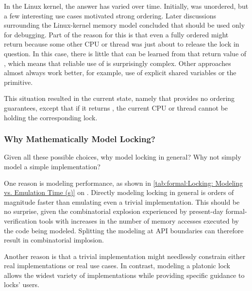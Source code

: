 In the Linux kernel, the answer has varied over time.
Initially,  was unordered, but a few interesting
use cases motivated strong ordering.
Later discussions surrounding the Linux-kernel memory model concluded
that  should be used only for debugging.
Part of the reason for this is that even a fully ordered
 might return  because some other CPU or
thread was just about to release the lock in question.
In this case, there is little that can be learned from that return value
of , which means that reliable use of 
is surprisingly complex.
Other approaches almost always work better, for example, use of explicit
shared variables or the  primitive.

This situation resulted in the current state, namely that
 provides no ordering guarantees, except that if
it returns , the current CPU or thread cannot be holding the
corresponding lock.

\QuickQuizEnd

\subsubsection{Why Mathematically Model Locking?}
\label{sec:memorder:Why Mathematically Model Locking?}

Given all these possible choices, why model locking in general?
Why not simply model a simple implementation?

One reason is modeling performance, as shown in
\cref{tab:formal:Locking: Modeling vs. Emulation Time (s)}
on
.
Directly modeling locking in general is orders of magnitude faster
than emulating even a trivial implementation.
This should be no surprise, given the combinatorial explosion experienced
by present-day formal-verification tools with increases in the number of
memory accesses executed by the code being modeled.
Splitting the modeling at API boundaries can therefore result in
combinatorial implosion.

Another reason is that a trivial implementation might needlessly constrain
either real implementations or real use cases.
In contrast, modeling a platonic lock allows the widest variety of
implementations while providing specific guidance to locks' users.

